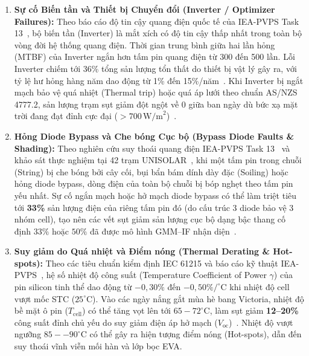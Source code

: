 \documentclass[12pt, a4paper]{report}
\begin{document}
\begin{enumerate}[label=\arabic*., leftmargin=*]
    \item \textbf{Sự cố Biến tần và Thiết bị Chuyển đổi (Inverter / Optimizer Failures):}
    Theo báo cáo độ tin cậy quang điện quốc tế của IEA-PVPS Task 13~\cite{iea2023pvps}, bộ biến tần (Inverter) là mắt xích có độ tin cậy thấp nhất trong toàn bộ vòng đời hệ thống quang điện. Thời gian trung bình giữa hai lần hỏng (MTBF) của Inverter ngắn hơn tấm pin quang điện từ 300 đến 500 lần. Lỗi Inverter chiếm tới 36\% tổng sản lượng tổn thất do thiết bị vật lý gây ra, với tỷ lệ hư hỏng hàng năm dao động từ 1\% đến 15\%/năm~\cite{iea2023pvps}. Khi Inverter bị ngắt mạch bảo vệ quá nhiệt (Thermal trip) hoặc quá áp lưới theo chuẩn AS/NZS 4777.2, sản lượng trạm sụt giảm đột ngột về 0 giữa ban ngày dù bức xạ mặt trời đang đạt đỉnh cực đại ($> 700 \, \text{W/m}^2$)~\cite{wimalaratne2022unisolar}.

    \item \textbf{Hỏng Diode Bypass và Che bóng Cục bộ (Bypass Diode Faults \& Shading):}
    Theo nghiên cứu suy thoái quang điện IEA-PVPS Task 13~\cite{iea2023pvps} và khảo sát thực nghiệm tại 42 trạm UNISOLAR~\cite{wimalaratne2022unisolar}, khi một tấm pin trong chuỗi (String) bị che bóng bởi cây cối, bụi bẩn bám dính dày đặc (Soiling) hoặc hỏng diode bypass, dòng điện của toàn bộ chuỗi bị bóp nghẹt theo tấm pin yếu nhất. Sự cố ngắn mạch hoặc hở mạch diode bypass có thể làm triệt tiêu tới \textbf{33\%} sản lượng điện của riêng tấm pin đó (do cấu trúc 3 diode bảo vệ 3 nhóm cell), tạo nên các vết sụt giảm sản lượng cục bộ dạng bậc thang cố định $33\%$ hoặc $50\%$ đã được mô hình GMM--IF nhận diện~\cite{li2025gmmif}.

    \item \textbf{Suy giảm do Quá nhiệt và Điểm nóng (Thermal Derating \& Hot-spots):}
    Theo các tiêu chuẩn kiểm định IEC 61215 và báo cáo kỹ thuật IEA-PVPS~\cite{iea2023pvps}, hệ số nhiệt độ công suất (Temperature Coefficient of Power $\gamma$) của pin silicon tinh thể dao động từ $-0{,}30\%$ đến $-0{,}50\%/^\circ\text{C}$ khi nhiệt độ cell vượt mốc STC ($25^\circ\text{C}$). Vào các ngày nắng gắt mùa hè bang Victoria, nhiệt độ bề mặt ô pin ($T_{\text{cell}}$) có thể tăng vọt lên tới $65-72^\circ\text{C}$, làm sụt giảm \textbf{12--20\%} công suất đỉnh chủ yếu do suy giảm điện áp hở mạch ($V_{\text{oc}}$)~\cite{wimalaratne2022unisolar}. Nhiệt độ vượt ngưỡng $85--90^\circ\text{C}$ có thể gây ra hiện tượng điểm nóng (Hot-spots), dẫn đến suy thoái vĩnh viễn mối hàn và lớp bọc EVA.


\end{enumerate}
\end{document}
